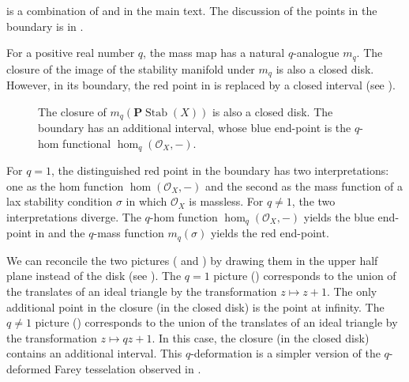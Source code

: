 \documentclass{amsart}
\begin{document}
   is a combination of  and  in the main text.
The discussion of the points in the boundary is in .

  For a positive real number \(q\), the mass map has a natural \(q\)-analogue \(m_q\).
  The closure of the image of the stability manifold under \(m_q\) is also a closed disk.
  However, in its boundary, the red point in  is replaced by a closed interval (see ).
  \begin{figure}[ht]
  \centering
      \caption{The closure of \(m_q(\mathbf{P} \operatorname{Stab}(X))\) is also a closed disk.
      The boundary has an additional interval, whose blue end-point is the \(q\)-hom functional \(\hom_q(\mathcal{O}_X,-)\).}
    \label{fig:q-disk}
  \end{figure}

  For \(q = 1\), the distinguished red point in the boundary has two interpretations: one as the hom function \(\hom(\mathcal{O}_X, -)\) and the second as the mass function of a lax stability condition \(\sigma\) in which \(\mathcal{O}_X\) is massless.
  For \(q \neq 1\), the two interpretations diverge.
  The \(q\)-hom function \(\hom_q(\mathcal{O}_X,-)\) yields the blue end-point in  and the \(q\)-mass function \(m_q(\sigma)\) yields the red end-point.
  
  We can reconcile the two pictures ( and ) by drawing them in the upper half plane instead of the disk (see ).
  The \(q = 1\) picture () corresponds to the union of the translates of an ideal triangle by the transformation \(z \mapsto z + 1\).
  The only additional point in the closure (in the closed disk) is the point at infinity.
  The \(q \neq 1\) picture () corresponds to the union of the translates of an ideal triangle by the transformation \(z \mapsto q z + 1\).
  In this case, the closure (in the closed disk) contains an additional interval.
  This \(q\)-deformation is a simpler version of the \(q\)-deformed Farey tesselation observed in \cite{bap.bec.lic:22}.
  
\end{document}
